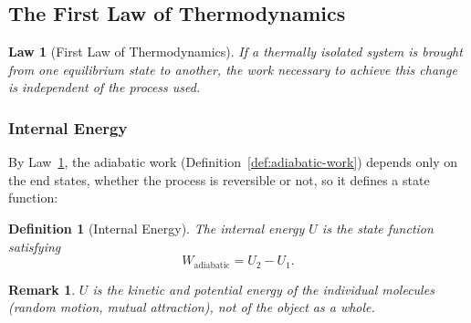 \documentclass{article}
\newtheorem{law}{Law}
\newtheorem{definition}{Definition}
\newtheorem{remark}{Remark}
\begin{document}
\subsection{The First Law of Thermodynamics}
\begin{law}[First Law of Thermodynamics]
    \label{law:first-law}
    If a thermally isolated system is brought from one equilibrium state to another, the work necessary to achieve this change is independent of the process used.
\end{law}

\subsubsection{Internal Energy}
By Law~\ref{law:first-law}, the adiabatic work (Definition~\ref{def:adiabatic-work}) depends only on the end states, whether the process is reversible or not, so it defines a state function:
\begin{definition}[Internal Energy]
    The internal energy $U$ is the state function satisfying
    \[W_{\text{adiabatic}} = U_2 - U_1.\]
\end{definition}
\begin{remark}
    $U$ is the kinetic and potential energy of the individual molecules (random motion, mutual attraction), not of the object as a whole.
\end{remark}
\end{document}

